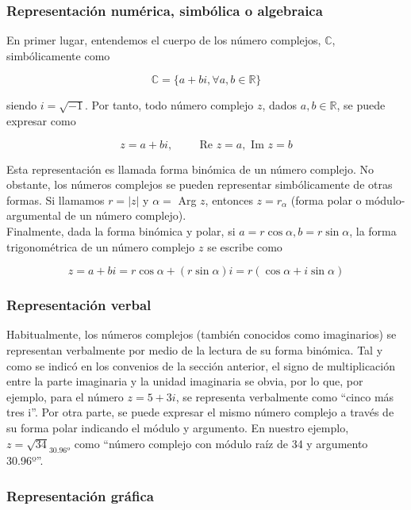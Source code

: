 \documentclass[../main.tex]{memoir}
\begin{document}
\subsubsection{Representación numérica, simbólica o algebraica}

En primer lugar, entendemos el cuerpo de los número complejos, $\mathbb{C}$, simbólicamente como 

$$\mathbb{C} = \{a+bi, \forall a,b \in \mathbb{R}\}$$

siendo $i = \sqrt{-1}$. Por tanto, todo número complejo $z$, dados $a,b \in \mathbb{R}$, se puede expresar como

$$z = a+bi, \hspace{1cm} \text{Re }z = a, \text{ Im }z = b$$

Esta representación es llamada forma binómica de un número complejo. No obstante, los números complejos se pueden representar simbólicamente de otras formas. Si llamamos $r = |z|$ y $\alpha = $ Arg $z$, entonces $z = r_{\alpha}$ (forma polar o módulo-argumental de un número complejo). \\

Finalmente, dada la forma binómica y polar, si $a = r \cos \alpha, b=r \sin \alpha$, la forma trigonométrica de un número complejo $z$ se escribe como

$$ z = a + bi = r \cos \alpha + (r \sin \alpha) i = r(\cos \alpha + i \sin \alpha)$$

\subsubsection{Representación verbal}

Habitualmente, los números complejos (también conocidos como imaginarios) se representan verbalmente por medio de la lectura de su forma binómica. Tal y como se indicó en los convenios de la sección anterior, el signo de multiplicación entre la parte imaginaria y la unidad imaginaria se obvia, por lo que, por ejemplo, para el número $z = 5+3i$, se representa verbalmente como ``cinco más tres i''. Por otra parte, se puede expresar el mismo número complejo a través de su forma polar indicando el módulo y argumento. En nuestro ejemplo, $z = \sqrt{34}_{30.96º}$ como ``número complejo con módulo raíz de 34 y argumento 30.96º''.

\subsubsection{Representación gráfica}
\end{document}
